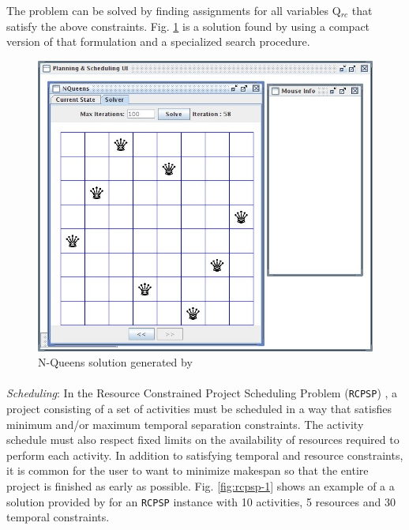 {The problem can be solved by finding assignments for all variables
Q$_{rc}$ that satisfy the above constraints. Fig. \ref{fig:nqueens-2}
is a solution found by \eu using a compact version of that formulation
and a specialized search procedure.

\begin{figure}
\centering
\includegraphics[scale=0.35]{figs/Example-NQueens1.jpg}
\caption{\small N-Queens solution generated by \eu}
\label{fig:nqueens-2}
\end{figure}


\paragraph{} \textit{Scheduling}: In the Resource Constrained Project
Scheduling Problem (\texttt{RCPSP}) \cite{Bruckera99}, a project
consisting of a set of activities must be scheduled in a way that
satisfies minimum and/or maximum temporal separation constraints. The
activity schedule must also respect fixed limits on the availability
of resources required to perform each activity. In addition to
satisfying temporal and resource constraints, it is common for the
user to want to minimize makespan \cite{ghallab04} so that the entire
project is finished as early as possible. Fig. \ref{fig:rcpsp-1} shows
an example of a a solution provided by \eu for an \texttt{RCPSP}
instance with 10 activities, 5 resources and 30 temporal constraints.

}
